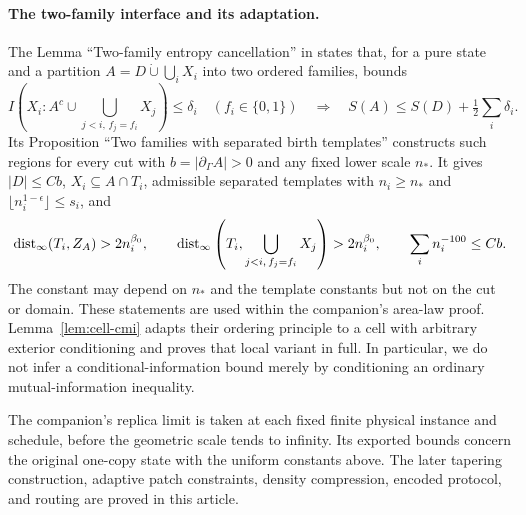 \paragraph{The two-family interface and its adaptation.}
The Lemma ``Two-family entropy cancellation'' in
\cite[Section~11]{RepoAreaLaw} states that, for a pure state and a partition
$A=D\mathbin{\dot\cup}\bigcup_iX_i$ into two ordered families, bounds
\[
 I\left(X_i:A^c\cup\bigcup_{j<i,\,f_j=f_i}X_j\right)\le\delta_i
 \quad(f_i\in\{0,1\})
 \quad\Longrightarrow\quad
 S(A)\le S(D)+\tfrac12\sum_i\delta_i.
\]
Its Proposition ``Two families with separated birth templates'' constructs
such regions for every cut with $b=|\partial_\Gamma A|>0$ and any fixed lower
scale $n_*$. It gives $|D|\le Cb$, $X_i\subseteq A\cap T_i$, admissible
separated templates with $n_i\ge n_*$ and
$\lfloor n_i^{1-\epsilon}\rfloor\le s_i$, and
\[
 \operatorname{dist}_\infty(T_i,Z_A)>2n_i^{\beta_0},\qquad
 \operatorname{dist}_\infty\left(T_i,\bigcup_{j<i,\,f_j=f_i}X_j\right)>2n_i^{\beta_0},
 \qquad \sum_i n_i^{-100}\le Cb.
\]
The constant may depend on $n_*$ and the template constants but not on the
cut or domain. These statements are used within the companion's area-law
proof. Lemma~\ref{lem:cell-cmi} adapts their ordering principle to a cell
with arbitrary exterior conditioning and proves that local variant in
full. In particular, we do not infer a conditional-information bound merely
by conditioning an ordinary mutual-information inequality.

The companion's replica limit is taken at each fixed finite physical
instance and schedule, before the geometric scale tends to infinity.
Its exported bounds concern the original one-copy state with the uniform
constants above. The later tapering construction, adaptive patch
constraints, density compression, encoded protocol, and routing are proved
in this article.
